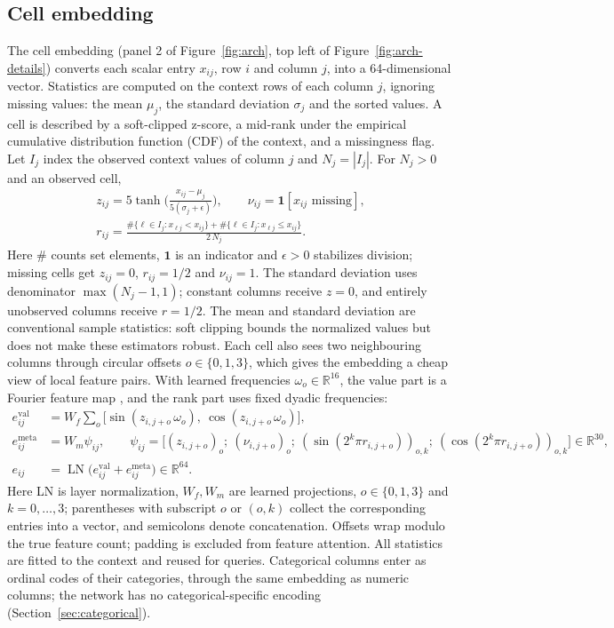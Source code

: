 \documentclass[11pt]{article}
\newcommand{\R}{\mathbb{R}}
\newcommand{\LN}{\operatorname{LN}}
\begin{document}
\subsection{Cell embedding}
The cell embedding (panel 2 of Figure~\ref{fig:arch}, top left of Figure~\ref{fig:arch-details})
converts each scalar entry $x_{ij}$, row $i$ and column $j$, into a 64-dimensional vector.
Statistics are computed on the context rows of each column $j$, ignoring missing values: the mean
$\mu_j$, the standard deviation $\sigma_j$ and the sorted values. A cell is described by a
soft-clipped z-score, a mid-rank under the empirical cumulative distribution function (CDF) of the
context, and a missingness flag. Let $I_j$ index the observed context values of column $j$ and
$N_j=|I_j|$. For $N_j>0$ and an observed cell,
\begin{equation}
\begin{aligned}
z_{ij}=5\tanh\!\Big(\frac{x_{ij}-\mu_j}{5(\sigma_j+\epsilon)}\Big),\qquad
\nu_{ij}=\mathbf{1}[x_{ij}\text{ missing}],\\
r_{ij}=\frac{\#\{\ell\in I_j:x_{\ell j}<x_{ij}\}+\#\{\ell\in I_j:x_{\ell j}\le x_{ij}\}}{2\,N_j}.
\end{aligned}
\end{equation}
Here $\#$ counts set elements, $\mathbf{1}$ is an indicator and $\epsilon>0$ stabilizes division;
missing cells get $z_{ij}=0$, $r_{ij}=1/2$ and $\nu_{ij}=1$.
The standard deviation uses denominator $\max(N_j-1,1)$; constant columns receive $z=0$, and
entirely unobserved columns receive $r=1/2$. The mean and standard deviation are conventional
sample statistics: soft clipping bounds the normalized values but does not make these estimators robust.
Each cell also sees two neighbouring columns through circular offsets $o\in\{0,1,3\}$, which gives
the embedding a cheap view of local feature pairs. With learned frequencies
$\omega_o\in\R^{16}$, the value part is a Fourier feature map \cite{tancik2020}, and the rank part
uses fixed dyadic frequencies:
\begin{align}
e^{\mathrm{val}}_{ij}&=W_f\sum_{o}\big[\sin(z_{i,j+o}\,\omega_o),\ \cos(z_{i,j+o}\,\omega_o)\big],\\
e^{\mathrm{meta}}_{ij}&=W_m\psi_{ij},\qquad
\psi_{ij}=\big[(z_{i,j+o})_o;\ (\nu_{i,j+o})_o;\
 (\sin(2^k\pi r_{i,j+o}))_{o,k};\
 (\cos(2^k\pi r_{i,j+o}))_{o,k}\big]\in\R^{30},\\
e_{ij}&=\LN\big(e^{\mathrm{val}}_{ij}+e^{\mathrm{meta}}_{ij}\big)\in\R^{64}.
\end{align}
Here LN is layer normalization, $W_f,W_m$ are learned projections, $o\in\{0,1,3\}$ and
$k=0,\dots,3$; parentheses with subscript $o$ or $(o,k)$ collect the corresponding entries into
a vector, and semicolons denote concatenation. Offsets wrap modulo the true feature count;
padding is excluded from feature attention. All
statistics are fitted to the context and reused for queries. Categorical columns enter as ordinal codes of
their categories, through the same embedding as numeric columns; the network has no categorical-specific
encoding (Section~\ref{sec:categorical}).
\end{document}
